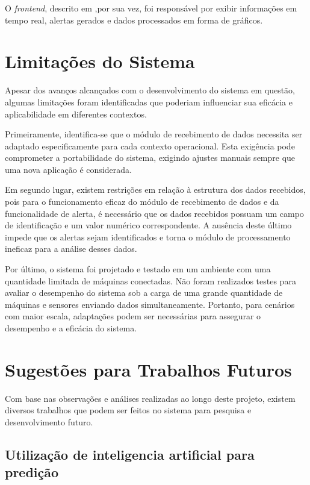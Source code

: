 O \emph{frontend}, descrito em \label{sec:implFront},por sua vez, foi responsável por exibir informações em tempo real, alertas gerados e dados processados em forma de gráficos.

\section{Limitações do Sistema}\label{sec:limitations}

Apesar dos avanços alcançados com o desenvolvimento do sistema em questão, algumas limitações foram identificadas que poderiam influenciar sua eficácia e aplicabilidade em diferentes contextos.

Primeiramente, identifica-se que o módulo de recebimento de dados necessita ser adaptado especificamente para cada contexto operacional. Esta exigência pode comprometer a portabilidade do sistema, exigindo ajustes manuais sempre que uma nova aplicação é considerada.

Em segundo lugar, existem restrições em relação à estrutura dos dados recebidos, pois para o funcionamento eficaz do módulo de recebimento de dados e da funcionalidade de alerta, é necessário que os dados recebidos possuam um campo de identificação e um valor numérico correspondente. A ausência deste último impede que os alertas sejam identificados e torna o módulo de processamento ineficaz para a análise desses dados.

Por último, o sistema foi projetado e testado em um ambiente com uma quantidade limitada de máquinas conectadas. Não foram realizados testes para avaliar o desempenho do sistema sob a carga de uma grande quantidade de máquinas e sensores enviando dados simultaneamente. Portanto, para cenários com maior escala, adaptações podem ser necessárias para assegurar o desempenho e a eficácia do sistema.


\section{Sugestões para Trabalhos Futuros}\label{sec:future_work}

Com base nas observações e análises realizadas ao longo deste projeto, existem diversos trabalhos que podem ser feitos no sistema para pesquisa e desenvolvimento futuro.


\subsection{Utilização de inteligencia artificial para predição}

